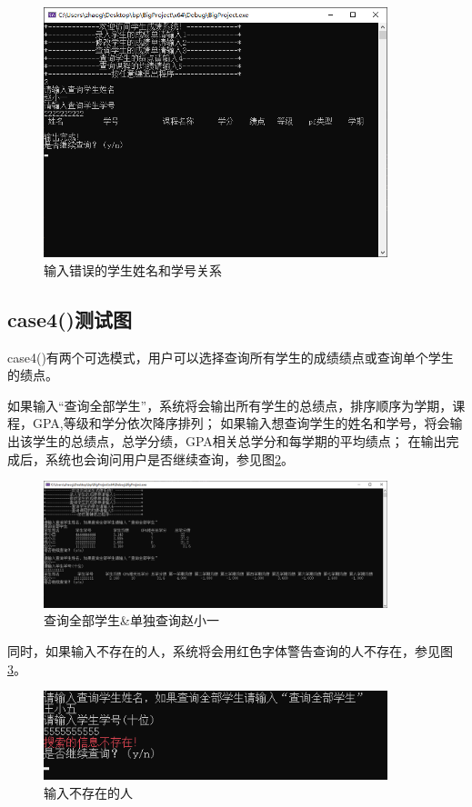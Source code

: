 \documentclass[fontset=windows]{article}
\begin{document}
\begin{figure}[h!]
	\begin{center}
		\includegraphics[width = 10cm]{case3 不存在2.png}
		\caption{输入错误的学生姓名和学号关系}
		\label{ref15}
	\end{center}
\end{figure}

\subsection{case4()测试图}
case4()有两个可选模式，用户可以选择查询所有学生的成绩绩点或查询单个学生的绩点。

如果输入“查询全部学生”，系统将会输出所有学生的总绩点，排序顺序为学期，课程，GPA,等级和学分依次降序排列；
如果输入想查询学生的姓名和学号，将会输出该学生的总绩点，总学分绩，GPA相关总学分和每学期的平均绩点；
在输出完成后，系统也会询问用户是否继续查询，参见图\ref{ref16}。
\newpage
\begin{figure}[h!]
	\begin{center}
		\includegraphics[width = 10cm]{case4 查询全部学生+赵小一 连续输出.png}
		\caption{查询全部学生\&单独查询赵小一}
		\label{ref16}
	\end{center}
\end{figure}

同时，如果输入不存在的人，系统将会用红色字体警告查询的人不存在，参见图\ref{ref17}。

\begin{figure}[h!]
	\begin{center}
		\includegraphics[width = 10cm]{case4 输入不存在的人.png}
		\caption{输入不存在的人}
		\label{ref17}
	\end{center}
\end{figure}
\end{document}
